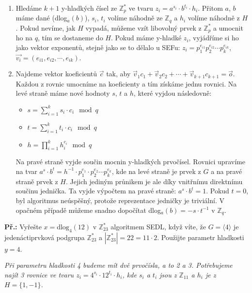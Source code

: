 \documentclass[10pt,a4paper]{article}
\begin{document}
\begin{enumerate}
\item Hledáme $k+1$ y-hladkých čísel ze $\mathbb{Z}_p^*$ ve tvaru $z_i = a^{s_i}\cdot b^{t_i}\cdot h_i$. Přitom $a$, $b$ máme dané (dlog$_a(b)$), $s_i$, $t_i$ volíme náhodně ze  $\mathbb{Z}_q$ a $h_i$ volíme náhodně z $H$. Pokud nevíme, jak $H$ vypadá, můžeme vzít libovolný prvek z  $\mathbb{Z}_p^*$ a umocnit ho na $q$, tím se dostaneme do $H$. Pokud máme y-hladké $z_i$, vyjádříme si ho jako vektor exponentů, stejně jako se to dělalo u SEFu: $z_i = p_1^{e_{i1}}p_2^{e_{i2}}\cdots p_k^{e_{ik}}$, $\vec{v_i} = (e_{i1}, e_{i2}, \cdots, e_{ik})$.
\item Najdeme vektor koeficientů $\vec{c}$ tak, aby $\vec{v}_1c_1 + \vec{v}_2c_2  + \cdots + \vec{v}_{k+1}c_{k+1} = \vec{o}$. Každou z rovnic umocníme na koeficienty a tím získáme jednu rovnici. Na levé straně máme nové hodnoty $s$, $t$ a $h$, které vyjdou následovně:
\begin{itemize}
\item $s = \sum_{i=1}^k s_i \cdot c_i \mod q$
\item $t = \sum_{i=1}^k t_i \cdot c_i \mod q$
\item $h = \prod_{i=1}^k h_i^{c_i} \mod q$
\end{itemize}
Na pravé straně vyjde součin mocnin y-hladkých prvočísel. Rovnici upravíme na tvar $a^s\cdot b^t = h^{-1}\cdot p_1^{e_1}\cdot p_2^{e_2}\cdots p_k^{e_k}$, kde na levé straně je prvek z $G$ a na pravé straně prvek z $H$. Jejich jediným průnikem je ale díky vnitřnímu direktnímu součinu jednička. Ta vyjde výpočtem na pravé straně: $a^s\cdot b^t = 1$. Pokud $t=0$, byl algoritmus neúspěšný, protože reprezentace jedničky je triviální. V opačném případě můžeme snadno dopočítat dlog$_a(b) = -s \cdot t^{-1}$ v $\mathbb{Z}_q$.
\end{enumerate}

\textbf{Př.:} Vyřešte $x = \text{dlog}_4 (12)$ v $\mathbb{Z}_{23}^*$ algoritmem SEDL, když víte, že $G = \langle 4 \rangle$ je jedenáctiprvková podgrupa $\mathbb{Z}_{23}^*$ a $|\mathbb{Z}_{23}^*| = 22 = 11 \cdot 2$. Použijte parametr hladkosti $y = 4$.

\textit{Při parametru hladkosti 4 budeme mít dvě prvočísla, a to 2 a 3. Potřebujeme najít 3 rovnice ve tvaru $z_i = 4^{s_i}\cdot 12^{t_i}\cdot h_i$, kde $s_i$ a $t_i$ jsou z $\mathbb{Z}_{11}$ a $h_i$ je z $H = \{1, -1\}$.}
\end{document}
